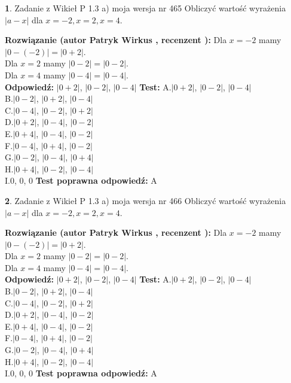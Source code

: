 \documentclass[12pt, a4paper]{article}
\theoremstyle{definition} %
\newtheorem{zad}{}
\newcommand{\zadStart}[1]{\begin{zad}#1\newline}
\newcommand{\zadStop}{\end{zad}}
\newcommand{\rozwStart}[2]{\noindent \textbf{Rozwiązanie (autor #1 , recenzent #2): }\newline}
\newcommand{\rozwStop}{\newline}
\newcommand{\odpStart}{\noindent \textbf{Odpowiedź:}\newline}
\newcommand{\odpStop}{\newline}
\newcommand{\testStart}{\noindent \textbf{Test:}\newline}
\newcommand{\testStop}{\newline}
\newcommand{\kluczStart}{\noindent \textbf{Test poprawna odpowiedź:}\newline}
\newcommand{\kluczStop}{\newline}
\begin{document}
\zadStart{Zadanie z Wikieł P 1.3 a) moja wersja nr 465}
Obliczyć wartość wyrażenia $|a - x|$ dla $x=-2,x=2,x=4$.
\zadStop
\rozwStart{Patryk Wirkus}{}
Dla $x = -2$ mamy $|0 - (-2)| = |0 + 2|$.\\
Dla $x = 2$ mamy $|0 - 2| = |0 - 2|$.\\
Dla $x = 4$ mamy $|0 - 4| = |0 - 4|$.\\
\rozwStop
\odpStart
$|0 + 2|$, $|0 - 2|$, $|0 - 4|$
\odpStop
\testStart
A.$|0 + 2|$, $|0 - 2|$, $|0 - 4|$\\
B.$|0 - 2|$, $|0 + 2|$, $|0 - 4|$\\
C.$|0 - 4|$, $|0 - 2|$, $|0 + 2|$\\
D.$|0 + 2|$, $|0 - 4|$, $|0 - 2|$\\
E.$|0 + 4|$, $|0 - 4|$, $|0 - 2|$\\
F.$|0 - 4|$, $|0 + 4|$, $|0 - 2|$\\
G.$|0 - 2|$, $|0 - 4|$, $|0 + 4|$\\
H.$|0 + 4|$, $|0 - 2|$, $|0 - 4|$\\
I.$0$, $0$, $0$
\testStop
\kluczStart
A
\kluczStop



\zadStart{Zadanie z Wikieł P 1.3 a) moja wersja nr 466}
Obliczyć wartość wyrażenia $|a - x|$ dla $x=-2,x=2,x=4$.
\zadStop
\rozwStart{Patryk Wirkus}{}
Dla $x = -2$ mamy $|0 - (-2)| = |0 + 2|$.\\
Dla $x = 2$ mamy $|0 - 2| = |0 - 2|$.\\
Dla $x = 4$ mamy $|0 - 4| = |0 - 4|$.\\
\rozwStop
\odpStart
$|0 + 2|$, $|0 - 2|$, $|0 - 4|$
\odpStop
\testStart
A.$|0 + 2|$, $|0 - 2|$, $|0 - 4|$\\
B.$|0 - 2|$, $|0 + 2|$, $|0 - 4|$\\
C.$|0 - 4|$, $|0 - 2|$, $|0 + 2|$\\
D.$|0 + 2|$, $|0 - 4|$, $|0 - 2|$\\
E.$|0 + 4|$, $|0 - 4|$, $|0 - 2|$\\
F.$|0 - 4|$, $|0 + 4|$, $|0 - 2|$\\
G.$|0 - 2|$, $|0 - 4|$, $|0 + 4|$\\
H.$|0 + 4|$, $|0 - 2|$, $|0 - 4|$\\
I.$0$, $0$, $0$
\testStop
\kluczStart
A
\kluczStop
\end{document}
